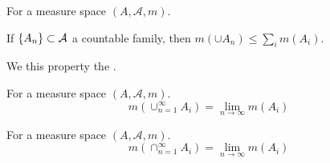 \begin{prop}
For a measure space $(A, \mathcal{A} , m)$.

If $\{A_n\} \subset \mathcal{A} $ a countable family,
then $m(\cup A_n) \leq \sum_{i} m(A_i)$.

We this property the
.
\end{prop}

\begin{prop}
For a measure space $(A, \mathcal{A} , m)$.
\[
m(\cup_{n = 1}^{\infty} A_i) = \lim_{n \to \infty} m(A_i)
\]
\end{prop}

\begin{prop}
For a measure space $(A, \mathcal{A} , m)$.
\[
m(\cap _{n = 1}^{\infty} A_i) = \lim_{n \to \infty} m(A_i)
\]
\end{prop}

